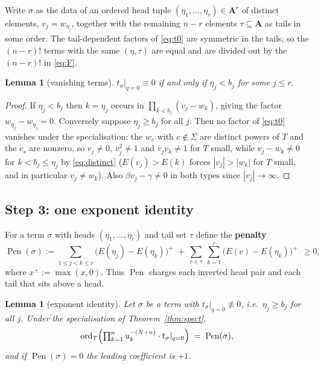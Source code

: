 \documentclass[11pt]{article}
\theoremstyle{plain}
\newtheorem{lem}[thm]{Lemma}
\theoremstyle{definition}
\newcommand{\bA}{\mathbf{A}}
\newcommand{\ord}{\operatorname{ord}}
\newcommand{\Pen}{\operatorname{Pen}}
\begin{document}
Write $\sigma$ as the data of an ordered head tuple
$(\eta_1,\dots,\eta_r)\in\bA^{r}$ of distinct elements, $v_j=w_{\eta_j}$, together
with the remaining $n-r$ elements $\tau\subseteq\bA$ as tails in some order.  The
tail-dependent factors of \eqref{eq:t0} are symmetric in the tails, so the
$(n-r)!$ terms with the same $(\eta,\tau)$ are equal and are divided out by the
$(n-r)!$ in \eqref{eq:F}.

\begin{lem}[vanishing terms]\label{lem:zero}
$t_\sigma|_{q=0}\equiv0$ if and only if $\eta_j<b_j$ for some $j\le r$.
\end{lem}

\begin{proof}
If $\eta_j<b_j$ then $k=\eta_j$ occurs in $\prod_{k<b_j}(v_j-w_k)$, giving the
factor $w_{\eta_j}-w_{\eta_j}=0$.  Conversely suppose $\eta_j\ge b_j$ for all
$j$.  Then no factor of \eqref{eq:t0} vanishes under the specialisation: the
$w_c$ with $c\notin\Sigma$ are distinct powers of $T$ and the $c_s$ are nonzero,
so $v_j\ne0$, $v_j^{2}\ne1$ and $v_jv_k\ne1$ for $T$ small, while
$v_j-w_k\ne0$ for $k<b_j\le\eta_j$ by \eqref{eq:distinct} ($E(v_j)>E(k)$ forces
$|v_j|>|w_k|$ for $T$ small, and in particular $v_j\ne w_k$).  Also
$\beta v_j-\gamma\ne0$ in both types since $|v_j|\to\infty$.
\end{proof}

\subsection{Step 3: one exponent identity}

For a term $\sigma$ with heads $(\eta_1,\dots,\eta_r)$ and tail set $\tau$ define
the \textbf{penalty}
\begin{equation}\label{eq:pen}
  \Pen(\sigma):=\sum_{1\le j<k\le r}\bigl(E(\eta_j)-E(\eta_k)\bigr)^{+}
   \;+\;\sum_{c\in\tau}\ \sum_{k=1}^{r}\bigl(E(c)-E(\eta_k)\bigr)^{+}
   \ \ \ge0 ,
\end{equation}
where $x^{+}:=\max(x,0)$.  Thus $\Pen$ charges each inverted head pair and each
tail that sits above a head.

\begin{lem}[exponent identity]\label{lem:ord}
Let $\sigma$ be a term with $t_\sigma|_{q=0}\not\equiv0$, i.e.\ $\eta_j\ge b_j$
for all $j$.  Under the specialisation of Theorem~\ref{thm:spect},
\[
  \ord_T\Bigl(\textstyle\prod_{k=1}^{n}u_k^{-(N+n)}\cdot t_\sigma|_{q=0}\Bigr)
  \;=\;\Pen(\sigma),
\]
and if $\Pen(\sigma)=0$ the leading coefficient is $+1$.
\end{lem}
\end{document}

